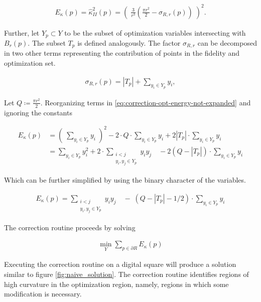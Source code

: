 \documentclass[runningheads]{llncs}
\begin{document}
		\begin{align}
			E_{\kappa}(p) = \hat{\kappa}_{II}^2(p)	=	\left( \; \frac{3}{r^3}\left( \frac{\pi r^2}{2} - \sigma_{R,r}(p) \right) \; \right)^2.\label{eq:correction-opt-energy-not-expanded}
		\end{align}

	
	Further, let $Y_{p} \subset Y$ to be the subset of optimization variables intersecting with $B_r(p)$. The subset $T_p$ is defined analogously. The factor $\sigma_{R,r}$ can be decomposed in two other terms representing the contribution of points in the fidelity and optimization set.
	
	\begin{align*}
		\sigma_{R,r}(p) = |T_{p}| + \sum_{y_i \in Y_p}{y_i},
	\end{align*}
	
	Let $Q \coloneqq \frac{\pi r^2}{2}$. Reorganizing terms in \eqref{eq:correction-opt-energy-not-expanded} and ignoring the constants 
	
	\begin{align*}
		E_{\kappa}(p) &= \left( \; \sum_{y_i \in Y_{p}}{y_i} \; \right) ^2 -2 \cdot Q\cdot \sum_{y_i \in Y_{p}}{y_i} + 2 |T_p| \cdot \sum_{ y_i \in Y_{p} }{y_i} \\[1em]
		&= \sum_{y_i \in Y_{p}}{y_i^2} + 2 \cdot \sum_{ \substack{ i<j \\ y_i,y_j \in Y_{p}  } }{y_iy_j} \quad - 2 (Q-|T_p|)\cdot \sum_{y_i \in Y_{p}}{y_i}
	\end{align*}
	
	Which can be further simplified by using the binary character of the variables.
	
	\begin{align*}
		E_{\kappa}(p) =\sum_{ \substack{ i<j \\ y_i,y_j \in Y_{p}  } }{y_iy_j} \quad  - \;(Q-|T_p|-1/2)\cdot \sum_{y_i \in Y_{p}}{y_i}
	\end{align*}	
	
	The correction routine proceeds by solving
	
	\begin{align}
		\min_{Y} \sum_{p \in \partial R}E_{\kappa}(p)
		\label{eq:optimization_problem_no_conn}
	\end{align}
	
	Executing the correction routine on a digital square will produce a solution similar to figure \ref{fig:naive_solution}. The correction routine identifies regions of high curvature in the optimization region, namely, regions in which some modification is necessary. 
	
\end{document}
